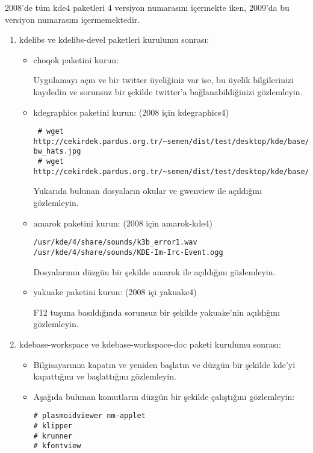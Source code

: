 \documentclass[a4paper,10pt]{article}
\begin{document}
2008'de tüm kde4 paketleri 4 versiyon numarasını içermekte iken, 2009'da bu versiyon numarasını içermemektedir.
\begin{enumerate} 
 \item kdelibs ve kdelibs-devel paketleri kurulumu sonrası:
\begin{itemize}
 \item choqok paketini kurun: 

Uygulamayı açın ve bir twitter üyeliğiniz var ise, bu üyelik bilgilerinizi kaydedin ve sorunsuz bir şekilde twitter'a bağlanabildiğinizi gözlemleyin.
 \item kdegraphics paketini kurun: (2008 için kdegraphics4)
\begin{verbatim}
 # wget http://cekirdek.pardus.org.tr/~semen/dist/test/desktop/kde/base/circus-bw_hats.jpg
 # wget http://cekirdek.pardus.org.tr/~semen/dist/test/desktop/kde/base/tepecik_01.png
\end{verbatim}
Yukarıda bulunan dosyaların okular ve gwenview ile açıldığını gözlemleyin.
\item amarok paketini kurun: (2008 için amarok-kde4) 

\begin{verbatim}
/usr/kde/4/share/sounds/k3b_error1.wav
/usr/kde/4/share/sounds/KDE-Im-Irc-Event.ogg
\end{verbatim}

Dosyalarının düzgün bir şekilde amarok ile açıldığını gözlemleyin.

\item yakuake paketini kurun: (2008 içi yakuake4)

F12 tuşuna basıldığında sorunsuz bir şekilde yakuake'nin açıldığını gözlemleyin.
\end{itemize}
\item kdebase-workspace ve kdebase-workspace-doc paketi kurulumu sonrası:
\begin{itemize}

 \item Bilgisayarınızı kapatın ve yeniden başlatın ve düzgün bir şekilde kde'yi kapattığını ve başlattığını gözlemleyin.

 \item Aşağıda bulunan komutların düzgün bir şekilde çalıştığını gözlemleyin:
\begin{verbatim}
# plasmoidviewer nm-applet 
# klipper
# krunner
# kfontview
\end{verbatim}

\end{itemize}


\end{enumerate}
\end{document}

